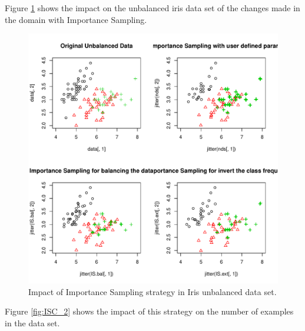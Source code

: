 \documentclass[10pt,a4paper]{article}\usepackage[]{graphicx}\usepackage[]{color}
\makeatletter
\def\maxwidth{ %
  \ifdim\Gin@nat@width>\linewidth
    \linewidth
  \else
    \Gin@nat@width
  \fi
}
\newenvironment{knitrout}{}{} %
\makeatother
\begin{document}
Figure \ref{fig:ISC} shows the impact on the unbalanced iris data set of the changes made in the domain with Importance Sampling.
\begin{knitrout}\footnotesize
{}\color{fgcolor}\begin{figure}

{\centering \includegraphics[width=\maxwidth]{figures/UBL-ISC-1} 

}

\caption[Impact of Importance Sampling strategy in Iris unbalanced data set]{Impact of Importance Sampling strategy in Iris unbalanced data set.}\label{fig:ISC}
\end{figure}


\end{knitrout}



Figure \ref{fig:ISC_2} shows the impact of this strategy on the number of examples in the data set.
\end{document}
